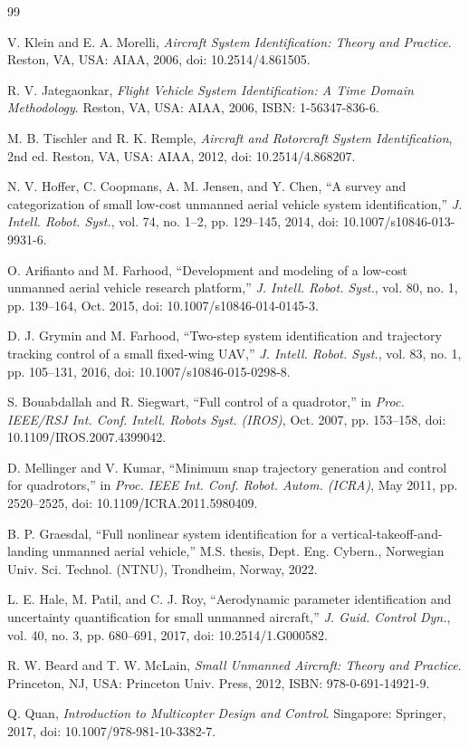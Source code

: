 \documentclass{ieeeaccess}
\begin{document}
\begin{thebibliography}{99}

 V. Klein and E. A. Morelli, \textit{Aircraft System Identification: Theory and Practice}. Reston, VA, USA: AIAA, 2006, doi: 10.2514/4.861505.

 R. V. Jategaonkar, \textit{Flight Vehicle System Identification: A Time Domain Methodology}. Reston, VA, USA: AIAA, 2006, ISBN: 1-56347-836-6.

 M. B. Tischler and R. K. Remple, \textit{Aircraft and Rotorcraft System Identification}, 2nd ed. Reston, VA, USA: AIAA, 2012, doi: 10.2514/4.868207.

 N. V. Hoffer, C. Coopmans, A. M. Jensen, and Y. Chen, ``A survey and categorization of small low-cost unmanned aerial vehicle system identification,'' \textit{J. Intell. Robot. Syst.}, vol. 74, no. 1--2, pp. 129--145, 2014, doi: 10.1007/s10846-013-9931-6.

 O. Arifianto and M. Farhood, ``Development and modeling of a low-cost unmanned aerial vehicle research platform,'' \textit{J. Intell. Robot. Syst.}, vol. 80, no. 1, pp. 139--164, Oct. 2015, doi: 10.1007/s10846-014-0145-3.

 D. J. Grymin and M. Farhood, ``Two-step system identification and trajectory tracking control of a small fixed-wing UAV,'' \textit{J. Intell. Robot. Syst.}, vol. 83, no. 1, pp. 105--131, 2016, doi: 10.1007/s10846-015-0298-8.

 S. Bouabdallah and R. Siegwart, ``Full control of a quadrotor,'' in \textit{Proc. IEEE/RSJ Int. Conf. Intell. Robots Syst. (IROS)}, Oct. 2007, pp. 153--158, doi: 10.1109/IROS.2007.4399042.

 D. Mellinger and V. Kumar, ``Minimum snap trajectory generation and control for quadrotors,'' in \textit{Proc. IEEE Int. Conf. Robot. Autom. (ICRA)}, May 2011, pp. 2520--2525, doi: 10.1109/ICRA.2011.5980409.

 B. P. Graesdal, ``Full nonlinear system identification for a vertical-takeoff-and-landing unmanned aerial vehicle,'' M.S. thesis, Dept. Eng. Cybern., Norwegian Univ. Sci. Technol. (NTNU), Trondheim, Norway, 2022.

 L. E. Hale, M. Patil, and C. J. Roy, ``Aerodynamic parameter identification and uncertainty quantification for small unmanned aircraft,'' \textit{J. Guid. Control Dyn.}, vol. 40, no. 3, pp. 680--691, 2017, doi: 10.2514/1.G000582.

 R. W. Beard and T. W. McLain, \textit{Small Unmanned Aircraft: Theory and Practice}. Princeton, NJ, USA: Princeton Univ. Press, 2012, ISBN: 978-0-691-14921-9.

 Q. Quan, \textit{Introduction to Multicopter Design and Control}. Singapore: Springer, 2017, doi: 10.1007/978-981-10-3382-7.

\end{thebibliography}

\EOD
\end{document}
